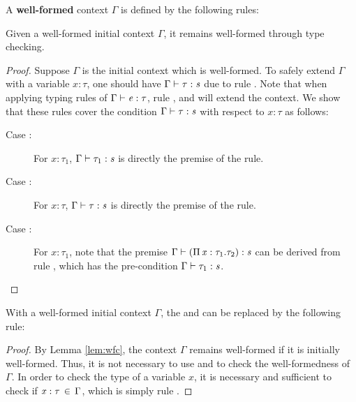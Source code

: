\begin{dfn}
	A \textbf{well-formed} context $\Gamma$ is defined by the following rules:
	
	\textnormal{\ottdefnctx{}}
\end{dfn}

\begin{lem}\label{lem:wfc}
	Given a well-formed initial context $\Gamma$, it remains well-formed through type checking.
\end{lem}

\begin{proof}
	Suppose $\Gamma$ is the initial context which is well-formed. To safely extend $\Gamma$ with a variable $x:\tau$, one should have $\Gamma  \vdash  \tau  :  \mathit{s}$ due to rule . Note that when applying typing rules of $\Gamma  \vdash  \mathit{e}  :  \tau$, rule ,  and  will extend the context. We show that these rules cover the condition $\Gamma  \vdash  \tau  :  \mathit{s}$ with respect to $x:\tau$ as follows:
	\begin{description}
		\item[Case :] \ottusedrule{\ottdruleTXXPi{}} For $x:\tau_{{\mathrm{1}}}$, $\Gamma  \vdash  \tau_{{\mathrm{1}}}  :  \mathit{s}$ is directly the premise of the rule.
		\item[Case :] \ottusedrule{\ottdruleTXXMu{}} For $x:\tau$, $\Gamma  \vdash  \tau  :  \mathit{s}$ is directly the premise of the rule.
		\item[Case :] \ottusedrule{\ottdruleTXXLam{}} For $x:\tau_{{\mathrm{1}}}$, note that the premise $\Gamma  \vdash  (  \Pi \, \mathit{x}  :  \tau_{{\mathrm{1}}}  .  \tau_{{\mathrm{2}}}  )  :  \mathit{s}$ can be derived from rule , which has the pre-condition $\Gamma  \vdash  \tau_{{\mathrm{1}}}  :  \mathit{s}$.
	\end{description}
\end{proof}

\begin{lem}\label{lem:wfcopt}
	With a well-formed initial context $\Gamma$, the  and  can be replaced by the following rule: \ottusedrule{\ottdruleTSXXVar{}}
\end{lem}

\begin{proof}
	By Lemma \ref{lem:wfc}, the context $\Gamma$ remains well-formed if it is initially well-formed. Thus, it is not necessary to use  and  to check the well-formedness of $\Gamma$. In order to check the type of a variable $x$, it is necessary and sufficient to check if $\mathit{x}  :  \tau \, \in \, \Gamma$, which is simply rule . 
\end{proof}

